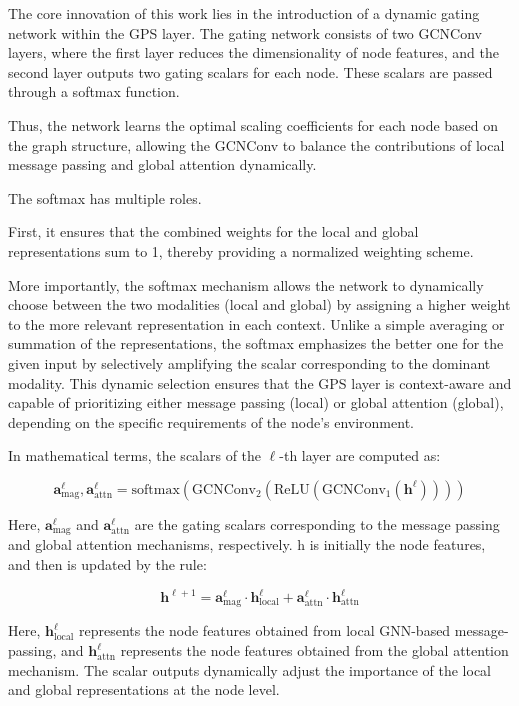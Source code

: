 \documentclass{acmart}
\begin{document}
The core innovation of this work lies in the introduction of a dynamic gating network within the GPS layer. The gating network consists of two GCNConv layers, where the first layer reduces the dimensionality of node features, and the second layer outputs two gating scalars for each node. These scalars are passed through a softmax function.

Thus, the network learns the optimal scaling coefficients for each node based on the graph structure, allowing the GCNConv to balance the contributions of local message passing and global attention dynamically.

The softmax has multiple roles. 

First, it ensures that the combined weights for the local and global representations sum to 1, thereby providing a normalized weighting scheme. 

More importantly, the softmax mechanism allows the network to dynamically choose between the two modalities (local and global) by assigning a higher weight to the more relevant representation in each context. Unlike a simple averaging or summation of the representations, the softmax emphasizes the better one for the given input by selectively amplifying the scalar corresponding to the dominant modality. This dynamic selection ensures that the GPS layer is context-aware and capable of prioritizing either message passing (local) or global attention (global), depending on the specific requirements of the node’s environment.

In mathematical terms, the scalars of the $\ell$-th layer are computed as:

\begin{equation}
\mathbf{a}_{\text{mag}}^{\ell}, \mathbf{a}_{\text{attn}}^{\ell} = \text{softmax}\left(\text{GCNConv}_2\left(\text{ReLU}\left(\text{GCNConv}_1(\mathbf{h}^{\ell})\right)\right)\right)
\end{equation}


Here, \( \mathbf{a}_{\text{mag}}^{\ell} \) and \( \mathbf{a}_{\text{attn}}^{\ell} \) are the gating scalars corresponding to the message passing and global attention mechanisms, respectively. h is initially the node features, and then is updated by the rule:

\[
\mathbf{h}^{\ell+1} = \mathbf{a}_{\text{mag}}^{\ell} \cdot \mathbf{h}_{\text{local}}^{\ell} + \mathbf{a}_{\text{attn}}^{\ell} \cdot \mathbf{h}_{\text{attn}}^{\ell}
\]

Here, $\mathbf{h}_{\text{local}}^{\ell}$ represents the node features obtained from local GNN-based message-passing, and $\mathbf{h}_{\text{attn}}^{\ell}$ represents the node features obtained from the global attention mechanism. The scalar outputs dynamically adjust the importance of the local and global representations at the node level.
\end{document}
